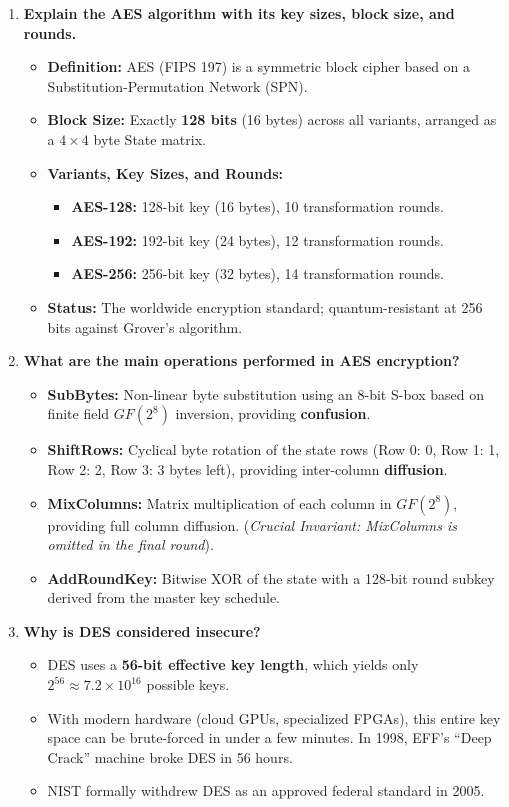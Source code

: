 \begin{enumerate}[label=\textbf{Q\arabic*.},leftmargin=1.2cm]
\item \textbf{Explain the AES algorithm with its key sizes, block size, and rounds.}
\begin{itemize}
\item \textbf{Definition:} AES (FIPS 197) is a symmetric block cipher based on a Substitution-Permutation Network (SPN).
\item \textbf{Block Size:} Exactly \textbf{128 bits} (16 bytes) across all variants, arranged as a $4 \times 4$ byte State matrix.
\item \textbf{Variants, Key Sizes, and Rounds:}
\begin{itemize}
\item \textbf{AES-128:} 128-bit key (16 bytes), 10 transformation rounds.
\item \textbf{AES-192:} 192-bit key (24 bytes), 12 transformation rounds.
\item \textbf{AES-256:} 256-bit key (32 bytes), 14 transformation rounds.
\end{itemize}
\item \textbf{Status:} The worldwide encryption standard; quantum-resistant at 256 bits against Grover's algorithm.
\end{itemize}

\item \textbf{What are the main operations performed in AES encryption?}
\begin{itemize}
\item \textbf{SubBytes:} Non-linear byte substitution using an 8-bit S-box based on finite field $GF(2^8)$ inversion, providing \textbf{confusion}.
\item \textbf{ShiftRows:} Cyclical byte rotation of the state rows (Row 0: 0, Row 1: 1, Row 2: 2, Row 3: 3 bytes left), providing inter-column \textbf{diffusion}.
\item \textbf{MixColumns:} Matrix multiplication of each column in $GF(2^8)$, providing full column diffusion. (\textit{Crucial Invariant: MixColumns is omitted in the final round}).
\item \textbf{AddRoundKey:} Bitwise XOR of the state with a 128-bit round subkey derived from the master key schedule.
\end{itemize}

\item \textbf{Why is DES considered insecure?}
\begin{itemize}
\item DES uses a \textbf{56-bit effective key length}, which yields only $2^{56} \approx 7.2 \times 10^{16}$ possible keys.
\item With modern hardware (cloud GPUs, specialized FPGAs), this entire key space can be brute-forced in under a few minutes. In 1998, EFF's ``Deep Crack'' machine broke DES in 56 hours.
\item NIST formally withdrew DES as an approved federal standard in 2005.
\end{itemize}


\end{enumerate}
